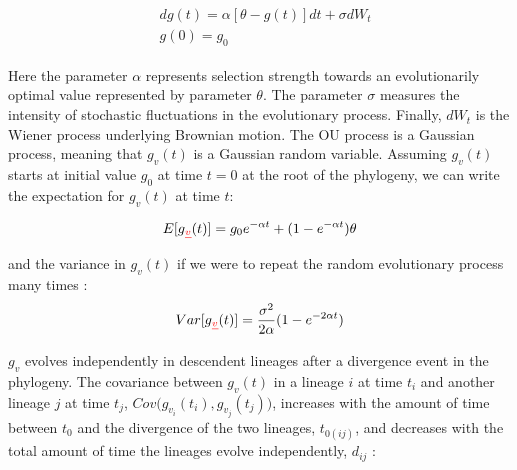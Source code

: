 \documentclass[11pt]{article} %
\providecommand{\DIFadd}[1]{{\protect\color{blue}\uwave{#1}}} %
\providecommand{\DIFdel}[1]{{\protect\color{red}\sout{#1}}}                      %
\providecommand{\DIFaddbegin}{} %
\providecommand{\DIFaddend}{} %
\providecommand{\DIFdelbegin}{} %
\providecommand{\DIFdelend}{} %
\newcommand{\DIFscaledelfig}{0.5}
\newlength{\DIFdelgraphicswidth} %
\newlength{\DIFdelgraphicsheight} %
\newcommand{\DIFaddincludegraphics}[2][]{{\color{blue}\fbox{\DIFOincludegraphics[#1]{#2}}}} %
\newcommand{\DIFdelincludegraphics}[2][]{%
\sbox{\DIFdelgraphicsbox}{\DIFOincludegraphics[#1]{#2}}%
\settoboxwidth{\DIFdelgraphicswidth}{\DIFdelgraphicsbox} %
\settoboxtotalheight{\DIFdelgraphicsheight}{\DIFdelgraphicsbox} %
\scalebox{\DIFscaledelfig}{%
\parbox[b]{\DIFdelgraphicswidth}{\usebox{\DIFdelgraphicsbox}\\[-\baselineskip] \rule{\DIFdelgraphicswidth}{0em}}\llap{\resizebox{\DIFdelgraphicswidth}{\DIFdelgraphicsheight}{%
\setlength{\unitlength}{\DIFdelgraphicswidth}%
\begin{picture}(1,1)%
\thicklines\linethickness{2pt} %
{\color[rgb]{1,0,0}\put(0,0){\framebox(1,1){}}}%
{\color[rgb]{1,0,0}\put(0,0){\line( 1,1){1}}}%
{\color[rgb]{1,0,0}\put(0,1){\line(1,-1){1}}}%
\end{picture}%
}\hspace*{3pt}}} %
} %
\DeclareRobustCommand{\DIFaddbegin}{\DIFOaddbegin \let\includegraphics\DIFaddincludegraphics} %
\DeclareRobustCommand{\DIFaddend}{\DIFOaddend \let\includegraphics\DIFOincludegraphics} %
\DeclareRobustCommand{\DIFdelbegin}{\DIFOdelbegin \let\includegraphics\DIFdelincludegraphics} %
\DeclareRobustCommand{\DIFdelend}{\DIFOaddend \let\includegraphics\DIFOincludegraphics} %
\begin{document}
\begin{linenumbers}
\DIFaddend \begin{align}
\DIFdelbegin %
\DIFdelend \DIFaddbegin \begin{split}
	&dg(t) = \alpha[\theta - g(t)]dt + \sigma dW_t \\
	&g(0) = g_0 
	\label{eq:OUprocess}
\end{split}\DIFaddend 
\end{align}

Here the parameter $\alpha$ represents selection strength towards an evolutionarily optimal value represented by parameter $\theta$. The parameter $\sigma$ measures the intensity of stochastic fluctuations in the evolutionary process. Finally, $dW_t$ is the Wiener process underlying Brownian motion. The OU process is a Gaussian process, meaning that \DIFdelbegin \DIFdel{$g_v(t)$ }\DIFdelend \DIFaddbegin \DIFadd{$g(t)$ }\DIFaddend is a Gaussian random variable. Assuming \DIFdelbegin \DIFdel{$g_v(t)$ }\DIFdelend \DIFaddbegin \DIFadd{$g(t)$ }\DIFaddend starts at initial value $g_0$ at time $t = 0$ at the root of the phylogeny, we can write the expectation for \DIFdelbegin \DIFdel{$g_v(t)$ }\DIFdelend \DIFaddbegin \DIFadd{$g(t)$ }\DIFaddend at time $t$: 
\DIFaddbegin 

\DIFaddend \begin{equation}
   E[g\DIFdelbegin \DIFdel{_v}\DIFdelend (t)] = g_0e^{-\alpha t} + (1 - e^{-\alpha t})\theta \label{eq:OUmean}
\end{equation}
and the variance in \DIFdelbegin \DIFdel{$g_v(t)$ }\DIFdelend \DIFaddbegin \DIFadd{$g(t)$ }\DIFaddend if we were to repeat the random evolutionary process many times \citep{Butler2004}:
\begin{equation}
    Var[g\DIFdelbegin \DIFdel{_v}\DIFdelend (t)] = \frac{\sigma^2}{2\alpha}(1 - e^{-2\alpha t}) \label{eq:OUVar}
\end{equation}

\DIFdelbegin \DIFdel{$g_v$ }\DIFdelend \DIFaddbegin \DIFadd{$g$ }\DIFaddend evolves independently in descendent lineages after a divergence event in the phylogeny. The covariance between \DIFdelbegin \DIFdel{$g_v(t)$ }\DIFdelend \DIFaddbegin \DIFadd{$g(t)$ }\DIFaddend in a lineage $i$ at time $t_i$ and another lineage $j$ at time $t_j$, \DIFdelbegin \DIFdel{$Cov\big(g_{v_i}(t_i), g_{v_j}(t_j)\big)$}\DIFdelend \DIFaddbegin \DIFadd{$Cov\big(g_{i}(t_i), g_{j}(t_j)\big)$}\DIFaddend , increases with the amount of time between $t_0$ and the divergence of the two lineages, $t_{0(ij)}$, and decreases with the total amount of time the lineages evolve independently, $d_{ij}$ \citep{Butler2004}: 
\DIFaddbegin 


\end{linenumbers}
\end{document}
